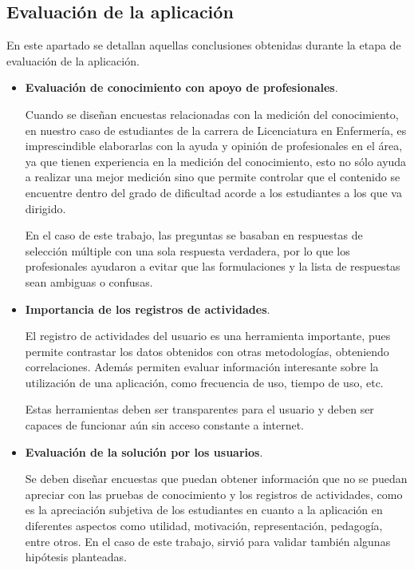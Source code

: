 \subsection{Evaluación de la aplicación}

En este apartado se detallan aquellas conclusiones obtenidas durante la 
etapa de evaluación de la aplicación.

\begin{itemize}
\item \textbf{Evaluación de conocimiento con apoyo de profesionales}.

Cuando se diseñan encuestas relacionadas con la medición del conocimiento, en
nuestro caso de estudiantes de la carrera de Licenciatura en Enfermería, es
imprescindible elaborarlas con la ayuda y opinión de profesionales en el área,
ya que tienen experiencia en la medición del conocimiento, esto no sólo ayuda 
a realizar una mejor medición sino que permite controlar que el contenido se
encuentre dentro del grado de dificultad acorde a los estudiantes a los que va
dirigido. 

En el caso de este trabajo, las preguntas se basaban en respuestas de 
selección múltiple con una sola respuesta verdadera, por lo que los 
profesionales ayudaron a evitar que las formulaciones y la lista de respuestas sean ambiguas o confusas.

\item \textbf{Importancia de los registros de actividades}.

El registro de actividades del usuario es una herramienta importante, pues
permite contrastar los datos obtenidos con otras metodologías, obteniendo
correlaciones. Además permiten evaluar información interesante sobre la
utilización de una aplicación, como frecuencia de uso, tiempo de uso, etc.

Estas herramientas deben ser transparentes para el usuario y deben ser capaces
de funcionar aún sin acceso constante a internet.

\item \textbf{Evaluación de la solución por los usuarios}.

Se deben diseñar encuestas que puedan obtener información que no se puedan
apreciar con las pruebas de conocimiento y los registros de actividades, como 
es la apreciación subjetiva de los estudiantes en cuanto a la aplicación en
diferentes aspectos como utilidad, motivación, representación, pedagogía,
entre otros. En el caso de este trabajo, sirvió para validar también algunas 
hipótesis planteadas.

\end{itemize}

